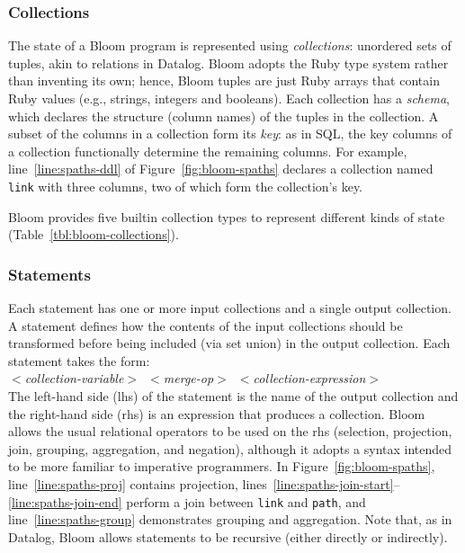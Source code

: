 \subsubsection{Collections}
The state of a Bloom program is represented using \emph{collections}: unordered
sets of tuples, akin to relations in Datalog. Bloom adopts the Ruby type system
rather than inventing its own; hence, Bloom tuples are just Ruby arrays that
contain Ruby values (e.g., strings, integers and booleans). Each collection has
a \emph{schema}, which declares the structure (column names) of the tuples in
the collection. A subset of the columns in a collection form its \emph{key}: as
in SQL, the key columns of a collection functionally determine the remaining
columns. For example, line~\ref{line:spaths-ddl} of
Figure~\ref{fig:bloom-spaths} declares a collection named \texttt{link} with
three columns, two of which form the collection's key.

Bloom provides five builtin collection types to represent different kinds of
state (Table~\ref{tbl:bloom-collections}).

\subsubsection{Statements}
Each statement has one or more input collections and a single output
collection. A statement defines how the contents of the input collections should
be transformed before being included (via set union) in the output
collection. Each statement takes the form: \\ \noindent
\mbox{\hspace{0.25in}\emph{$<$collection-variable$>$ $<$merge-op$>$
    $<$collection-expression$>$}}\\ \noindent
The left-hand side (lhs) of the statement is the name of the output collection
and the right-hand side (rhs) is an expression that produces a collection. Bloom
allows the usual relational operators to be used on the rhs (selection,
projection, join, grouping, aggregation, and negation), although it adopts a
syntax intended to be more familiar to imperative programmers. In
Figure~\ref{fig:bloom-spaths}, line~\ref{line:spaths-proj} contains projection,
lines~\ref{line:spaths-join-start}--\ref{line:spaths-join-end} perform a join
between \texttt{link} and \texttt{path}, and line~\ref{line:spaths-group}
demonstrates grouping and aggregation. Note that, as in Datalog, Bloom allows
statements to be recursive (either directly or
indirectly). %

